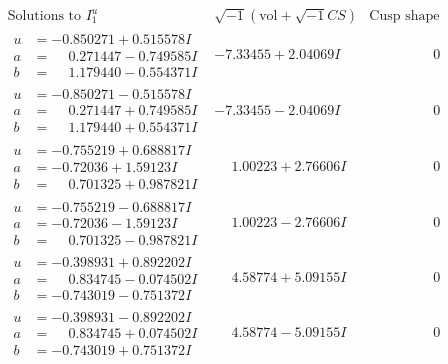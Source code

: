 \documentclass[1p]{elsarticle_modified}
\theoremstyle{definition}
\newcommand{\I}{\sqrt{-1}}
\begin{document}
$$\begin{array}{c|c|c}  
\text{Solutions to }I^u_{1}& \I (\text{vol} + \sqrt{-1}CS) & \text{Cusp shape}\\
 \hline 
\begin{aligned}
u &= -0.850271 + 0.515578 I \\
a &= \phantom{-}0.271447 - 0.749585 I \\
b &= \phantom{-}1.179440 - 0.554371 I\end{aligned}
 & -7.33455 + 2.04069 I & \phantom{-0.000000 } 0 \\ \hline\begin{aligned}
u &= -0.850271 - 0.515578 I \\
a &= \phantom{-}0.271447 + 0.749585 I \\
b &= \phantom{-}1.179440 + 0.554371 I\end{aligned}
 & -7.33455 - 2.04069 I & \phantom{-0.000000 } 0 \\ \hline\begin{aligned}
u &= -0.755219 + 0.688817 I \\
a &= -0.72036 + 1.59123 I \\
b &= \phantom{-}0.701325 + 0.987821 I\end{aligned}
 & \phantom{-}1.00223 + 2.76606 I & \phantom{-0.000000 } 0 \\ \hline\begin{aligned}
u &= -0.755219 - 0.688817 I \\
a &= -0.72036 - 1.59123 I \\
b &= \phantom{-}0.701325 - 0.987821 I\end{aligned}
 & \phantom{-}1.00223 - 2.76606 I & \phantom{-0.000000 } 0 \\ \hline\begin{aligned}
u &= -0.398931 + 0.892202 I \\
a &= \phantom{-}0.834745 - 0.074502 I \\
b &= -0.743019 - 0.751372 I\end{aligned}
 & \phantom{-}4.58774 + 5.09155 I & \phantom{-0.000000 } 0 \\ \hline\begin{aligned}
u &= -0.398931 - 0.892202 I \\
a &= \phantom{-}0.834745 + 0.074502 I \\
b &= -0.743019 + 0.751372 I\end{aligned}
 & \phantom{-}4.58774 - 5.09155 I & \phantom{-0.000000 } 0 \\ \hline\begin{aligned}

\end{aligned}
\end{array}$$
\end{document}
